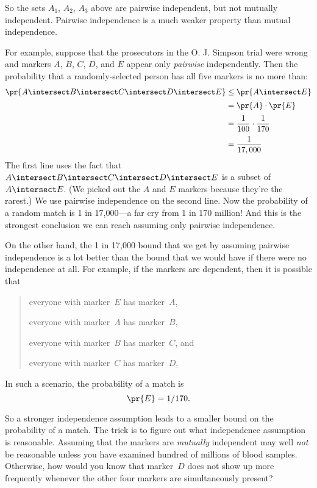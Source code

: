 So the sets $A_1$, $A_2$, $A_3$ above are pairwise independent, but
not mutually independent.  Pairwise independence is a much weaker
property than mutual independence.

For example, suppose that the prosecutors in the
O. J. Simpson trial were wrong and markers $A$, $B$, $C$, $D$, and $E$
appear only \emph{pairwise} independently.  Then the probability
that a randomly-selected person has all five markers is no more than:
%
\begin{align*}
\pr{A \intersect B \intersect C \intersect D \intersect E}
    & \leq \pr{A \intersect E} \\[2pt]
    & = \pr{A} \cdot \pr{E} \\[2pt]
    & = \frac{1}{100} \cdot \frac{1}{170} \\[2pt]
    & = \frac{1}{17,000}
\end{align*}
%
The first line uses the fact that $A \intersect B \intersect C \intersect
D \intersect E$ is a subset of $A \intersect E$.  (We picked out the $A$
and $E$ markers because they're the rarest.)  We use pairwise independence
on the second line.  Now the probability of a random match is 1 in
17,000---a far cry from 1 in 170 million!  And this is the strongest
conclusion we can reach assuming only pairwise independence.

On the other hand, the 1 in 17,000 bound that we get by assuming
pairwise independence is a lot better than the bound that we would
have if there were no independence at all.  For example, if the
markers are dependent, then it is possible that
\begin{quote}
everyone with marker~$E$ has marker~$A$,

everyone with marker~$A$ has marker~$B$,

everyone with marker~$B$ has marker~$C$, and

everyone with marker~$C$ has marker~$D$,
\end{quote}
In such a scenario, the probability of a match is
\begin{equation*}
    \pr{E} = 1/170.
\end{equation*}

So a stronger independence assumption leads to a smaller bound on the
probability of a match.  The trick is to figure out what independence
assumption is reasonable.  Assuming that the markers are
\emph{mutually} independent may well \emph{not} be reasonable unless
you have examined hundred of millions of blood samples.  Otherwise,
how would you know that marker~$D$ does not show up more frequently
whenever the other four markers are simultaneously present?

